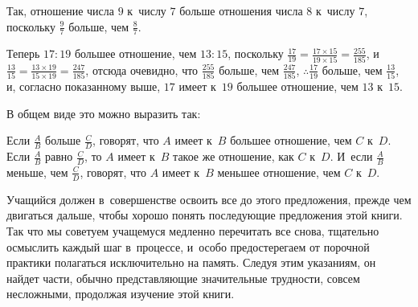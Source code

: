 \documentclass[letters,booklanguage=russian]{byrnebook}
\begin{document}
Так, отношение числа $9$ к~числу $7$ больше отношения числа $8$ к~числу $7$, поскольку $\frac{9}{7}$ больше, чем $\frac{8}{7}$.

Теперь $17 : 19$ большее отношение, чем $13 : 15$, поскольку $\frac{17}{19} = \frac{17 \times 15}{19 \times 15} = \frac{255}{185}$, и~$\frac{13}{15} = \frac{13 \times 19}{15 \times 19} = \frac{247}{185}$, отсюда очевидно, что $\frac{255}{185}$ больше, чем $\frac{247}{185}$, $\therefore \frac{17}{19}$ больше, чем $\frac{13}{15}$, и, согласно показанному выше, $17$ имеет к~$19$ большее отношение, чем $13$ к~$15$.

В общем виде это можно выразить так:

Если $\frac{A}{B}$ больше $\frac{C}{D}$, говорят, что $A$ имеет к~$B$ большее отношение, чем $C$ к~$D$. Если $\frac{A}{B}$ равно $\frac{C}{D}$, то $A$ имеет к~$B$ такое же отношение, как $C$ к~$D$. И~если $\frac{A}{B}$ меньше, чем $\frac{C}{D}$, говорят, что $A$ имеет к~$B$ меньшее отношение, чем $C$ к~$D$.

Учащийся должен в~совершенстве освоить все до этого предложения, прежде чем двигаться дальше, чтобы хорошо понять последующие предложения этой книги. Так что мы советуем учащемуся медленно перечитать все снова, тщательно осмыслить каждый шаг в~процессе, и~особо предостерегаем от порочной практики полагаться исключительно на память. Следуя этим указаниям, он найдет части, обычно представляющие значительные трудности, совсем несложными, продолжая изучение этой книги.

\vfill\pagebreak

\label{prop:V.IX}
\end{document}
